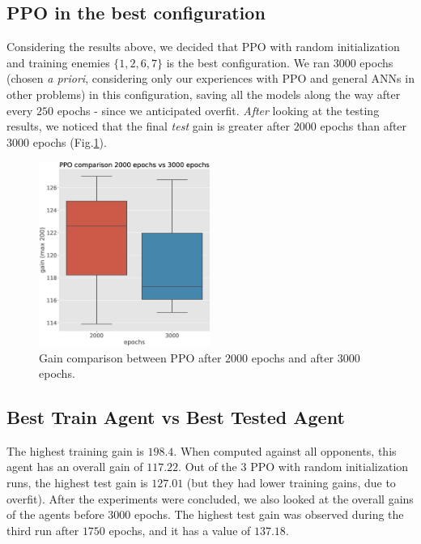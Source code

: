 \documentclass[conference]{IEEEtran}
\begin{document}
    \subsection{PPO in the best configuration}\label{subsec:ppo-on-the-best-configuration}
    Considering the results above, we decided that PPO with random initialization and training enemies $\{1, 2, 6, 7\}$ is the best configuration. We ran $3000$ epochs (chosen \textit{a priori}, considering only our experiences with PPO and general ANNs in other problems) in this configuration, saving all the models along the way after every $250$ epochs - since we anticipated overfit.
    \textit{After} looking at the testing results, we noticed that the final \textit{test} gain is greater after $2000$ epochs than after $3000$ epochs (Fig.\ref{fig:ppo_2000_vs_3000_epochs}).
    \begin{figure}[htbp]
        \centering
        \includegraphics[width=0.5\textwidth]{images/ppo_2000_vs_3000_epochs.eps}
        \caption{Gain comparison between PPO after $2000$ epochs and after $3000$ epochs.}
        \label{fig:ppo_2000_vs_3000_epochs}
    \end{figure}



    \subsection{Best Train Agent vs Best Tested Agent}\label{subsec:best-tested-agent}
    The highest training gain is $198.4$.
    When computed against all opponents, this agent has an overall gain of $117.22$.
    Out of the $3$ PPO with random initialization runs, the highest test gain is $127.01$ (but they had lower training gains, due to overfit).
    After the experiments were concluded, we also looked at the overall gains of the agents before $3000$ epochs.
    The highest test gain was observed during the third run after $1750$ epochs, and it has a value of $137.18$.
\end{document}
